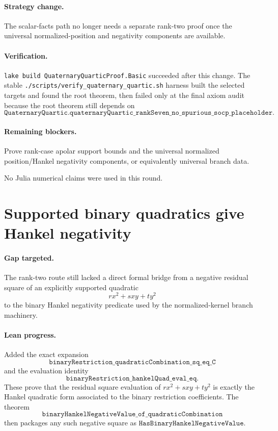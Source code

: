 \documentclass[11pt]{article}
\begin{document}
\paragraph{Strategy change.}
The scalar-facts path no longer needs a separate rank-two proof once the
universal normalized-position and negativity components are available.

\paragraph{Verification.}
\texttt{lake build QuaternaryQuarticProof.Basic} succeeded after this change.
The stable \texttt{./scripts/verify\_quaternary\_quartic.sh} harness built the
selected targets and found the root theorem, then failed only at the final axiom
audit because the root theorem still depends on
\[
\texttt{QuaternaryQuartic.quaternaryQuartic\_rankSeven\_no\_spurious\_socp\_placeholder}.
\]

\paragraph{Remaining blockers.}
Prove rank-case apolar support bounds and the universal normalized
position/Hankel negativity components, or equivalently universal branch data.

No Julia numerical claims were used in this round.

\section*{Supported binary quadratics give Hankel negativity}

\paragraph{Gap targeted.}
The rank-two route still lacked a direct formal bridge from a negative residual
square of an explicitly supported quadratic
\[
r x^2+sxy+t y^2
\]
to the binary Hankel negativity predicate used by the normalized-kernel branch
machinery.

\paragraph{Lean progress.}
Added the exact expansion
\[
\texttt{binaryRestriction\_quadraticCombination\_sq\_eq\_C}
\]
and the evaluation identity
\[
\texttt{binaryRestriction\_hankelQuad\_eval\_eq}.
\]
These prove that the residual square evaluation of
\(r x^2+sxy+t y^2\) is exactly the Hankel quadratic form associated to the
binary restriction coefficients.  The theorem
\[
\texttt{binaryHankelNegativeValue\_of\_quadraticCombination}
\]
then packages any such negative square as
\(\texttt{HasBinaryHankelNegativeValue}\).
\end{document}
